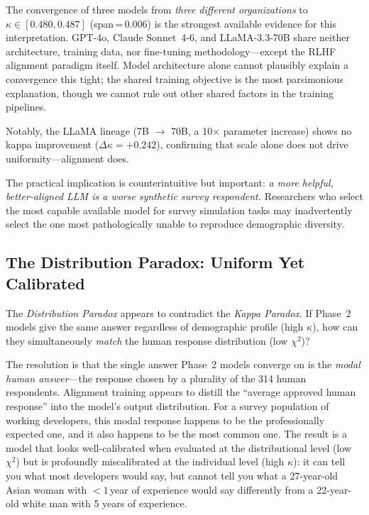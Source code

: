 \documentclass[sigconf,nonacm]{acmart}
\newcommand{\kp}{\textit{Kappa Paradox}\xspace}
\newcommand{\distrpar}{\textit{Distribution Paradox}\xspace}
\begin{document}
The convergence of three models from \emph{three different organizations}
to $\kappa \in [0.480, 0.487]$ (span\,=\,0.006) is the strongest available
evidence for this interpretation.
GPT-4o, Claude Sonnet~4-6, and LLaMA-3.3-70B share neither architecture,
training data, nor fine-tuning methodology---except the RLHF alignment
paradigm itself.
Model architecture alone cannot plausibly explain a convergence this tight;
the shared training objective is the most parsimonious explanation,
though we cannot rule out other shared factors in the training pipelines.

Notably, the LLaMA lineage (7B $\rightarrow$ 70B, a 10$\times$ parameter
increase) shows no kappa improvement ($\Delta\kappa = +0.242$), confirming
that scale alone does not drive uniformity---alignment does.

The practical implication is counterintuitive but important:
\emph{a more helpful, better-aligned LLM is a worse synthetic survey respondent.}
Researchers who select the most capable available model for survey simulation
tasks may inadvertently select the one most pathologically unable to reproduce
demographic diversity.

\subsection{The Distribution Paradox: Uniform Yet Calibrated}
\label{sec:disc:dist}

The \distrpar appears to contradict the \kp.
If Phase~2 models give the same answer regardless of demographic profile
(high $\kappa$), how can they simultaneously \emph{match} the human response
distribution (low $\chi^2$)?

The resolution is that the single answer Phase~2 models converge on is the
\emph{modal human answer}---the response chosen by a plurality of the 314
human respondents.
Alignment training appears to distill the ``average approved human response''
into the model's output distribution.
For a survey population of working developers, this modal response happens
to be the professionally expected one, and it also happens to be the
most common one.
The result is a model that looks well-calibrated when evaluated at the
distributional level (low $\chi^2$) but is profoundly miscalibrated at
the individual level (high $\kappa$): it can tell you what most developers
would say, but cannot tell you what a 27-year-old Asian woman with
$<1$\,year of experience would say differently from a 22-year-old white
man with 5 years of experience.
\end{document}
